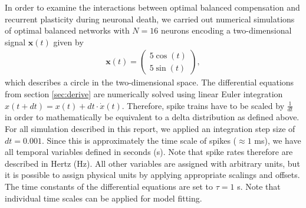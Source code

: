 \documentclass[twoside,twocolumn]{article}
\renewcommand{\b}[1]{\textbf{#1}}
\begin{document}
In order to examine the interactions between optimal balanced compensation and recurrent plasticity during neuronal death, we carried out numerical simulations of optimal balanced networks with $N=16$ neurons encoding a two-dimensional signal $\b{x}(t)$ given by
\begin{align}
\b{x}(t) = \begin{pmatrix}
5\cos(t) \\
5\sin(t)
\end{pmatrix},
\end{align}
which describes a circle in the two-dimensional space.
The differential equations from section \ref{sec:derive} are numerically solved using linear Euler integration $x(t+dt)=x(t)+dt\cdot\dot{x}(t)$. Therefore, spike trains have to be scaled by $\frac{1}{dt}$ in order to mathematically be equivalent to a delta distribution as defined above. For all simulation described in this report, we applied an integration step size of $dt = 0.001$. Since this is approximately the time scale of spikes ($\approx 1$ ms), we have all temporal variables defined in seconds (s). Note that spike rates therefore are described in Hertz (Hz). All other variables are assigned with arbitrary units, but it is possible to assign physical units by applying appropriate scalings and offsets. The time constants of the differential equations are set to $\tau=1$ s. Note that individual time scales can be applied for model fitting. 
\end{document}
